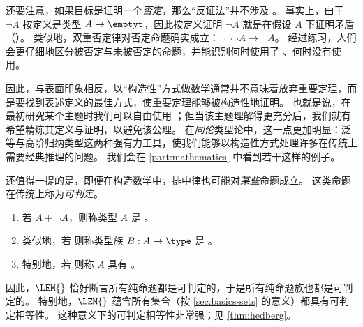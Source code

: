 还要注意，如果目标是证明一个\emph{否定}，那么“反证法”并不涉及 \LEM{}。
事实上，由于 $\neg A$ 按定义是类型 $A\to\emptyt$，因此按定义证明 $\neg A$ 就是在假设 $A$ 下证明矛盾（\emptyt）。
类似地，双重否定律对否定命题确实成立：$\neg\neg\neg A \to \neg A$。
经过练习，人们会更仔细地区分被否定与未被否定的命题，并能识别何时使用了 \LEM{}、何时没有使用。

因此，与表面印象相反，以“构造性”方式做数学通常并不意味着放弃重要定理，而是要找到表述定义的最佳方式，使重要定理能够被构造性地证明。
也就是说，在最初研究某个主题时我们可以自由使用 \LEM{}；但当该主题理解得更充分后，我们就有希望精炼其定义与证明，以避免该公理。
在\emph{同伦}类型论中，这一点更加明显：泛等与高阶归纳类型这两种强有力工具，使我们能够以构造性方式处理许多在传统上需要经典推理的问题。
我们会在 \cref{part:mathematics} 中看到若干这样的例子。

还值得一提的是，即便在构造数学中，排中律也可能对\emph{某些}命题成立。
这类命题在传统上称为\emph{可判定}。

\begin{defn}\label{defn:decidable-equality}
  \mbox{}
  \begin{enumerate}
  \item 若 $A+\neg A$，则称类型 $A$ 是
    。
  \item 类似地，若  \label{item:decidable-equality2}
    则称类型族 $B:A\to \type$ 是
    。
  \item 特别地，若 
    则称 $A$ 具有
    。
  \end{enumerate}
\end{defn}

因此，$\LEM{}$ 恰好断言所有纯命题都是可判定的，于是所有纯命题族也都是可判定的。
特别地，$\LEM{}$ 蕴含所有集合（按 \cref{sec:basics-sets} 的意义）都具有可判定相等性。
这种意义下的可判定相等性非常强；见 \cref{thm:hedberg}。

